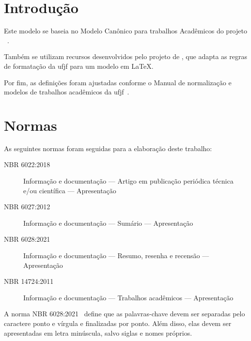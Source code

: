 \section{Introdução}%
\label{sec:introducao}

Este modelo se baseia no Modelo Canônico para trabalhos Acadêmicos do projeto \abnTeX~\cite{abntex2:2024}.

Também se utilizam recursos desenvolvidos pelo projeto de , que adapta as regras de formatação da \gls{ufjf} para um modelo em \LaTeX.

Por fim, as definições foram ajustadas conforme o Manual de normalização e modelos de trabalhos acadêmicos da \gls{ufjf}~\cite{cdd:2023}.

\section{Normas}%
\label{sec:normas}

As seguintes normas foram seguidas para a elaboração deste trabalho:

\begin{description}
    \item[NBR 6022:2018] Informação e documentação --- Artigo em publicação periódica técnica e/ou científica --- Apresentação~\cite{nbr6022:2018}
    \item[NBR 6027:2012] Informação e documentação --- Sumário --- Apresentação~\cite{nbr6027:2012}
    \item[NBR 6028:2021] Informação e documentação --- Resumo, resenha e recensão --- Apresentação~\cite{nbr6028:2021}
    \item[NBR 14724:2011] Informação e documentação --- Trabalhos acadêmicos --- Apresentação~\cite{nbr14724:2011}
\end{description}

A norma NBR 6028:2021~\cite{nbr6028:2021} define que as palavras-chave devem ser separadas pelo caractere ponto e vírgula e finalizadas por ponto.
Além disso, elas devem ser apresentadas em letra minúscula, salvo siglas e nomes próprios.
